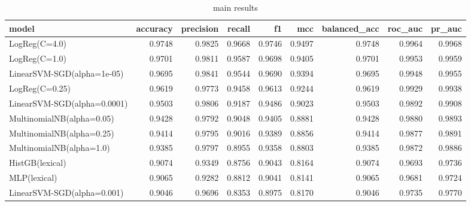 \begin{table}[htbp]
\caption{main results}
\label{tab:main_results}
\begin{tabular}{lrrrrrrrr}
\toprule
model & accuracy & precision & recall & f1 & mcc & balanced_acc & roc_auc & pr_auc \\
\midrule
LogReg(C=4.0) & 0.9748 & 0.9825 & 0.9668 & 0.9746 & 0.9497 & 0.9748 & 0.9964 & 0.9968 \\
LogReg(C=1.0) & 0.9701 & 0.9811 & 0.9587 & 0.9698 & 0.9405 & 0.9701 & 0.9953 & 0.9959 \\
LinearSVM-SGD(alpha=1e-05) & 0.9695 & 0.9841 & 0.9544 & 0.9690 & 0.9394 & 0.9695 & 0.9948 & 0.9955 \\
LogReg(C=0.25) & 0.9619 & 0.9773 & 0.9458 & 0.9613 & 0.9244 & 0.9619 & 0.9929 & 0.9938 \\
LinearSVM-SGD(alpha=0.0001) & 0.9503 & 0.9806 & 0.9187 & 0.9486 & 0.9023 & 0.9503 & 0.9892 & 0.9908 \\
MultinomialNB(alpha=0.05) & 0.9428 & 0.9792 & 0.9048 & 0.9405 & 0.8881 & 0.9428 & 0.9880 & 0.9893 \\
MultinomialNB(alpha=0.25) & 0.9414 & 0.9795 & 0.9016 & 0.9389 & 0.8856 & 0.9414 & 0.9877 & 0.9891 \\
MultinomialNB(alpha=1.0) & 0.9385 & 0.9797 & 0.8955 & 0.9358 & 0.8803 & 0.9385 & 0.9872 & 0.9886 \\
HistGB(lexical) & 0.9074 & 0.9349 & 0.8756 & 0.9043 & 0.8164 & 0.9074 & 0.9693 & 0.9736 \\
MLP(lexical) & 0.9065 & 0.9282 & 0.8812 & 0.9041 & 0.8141 & 0.9065 & 0.9681 & 0.9724 \\
LinearSVM-SGD(alpha=0.001) & 0.9046 & 0.9696 & 0.8353 & 0.8975 & 0.8170 & 0.9046 & 0.9735 & 0.9770 \\
\bottomrule
\end{tabular}
\end{table}

